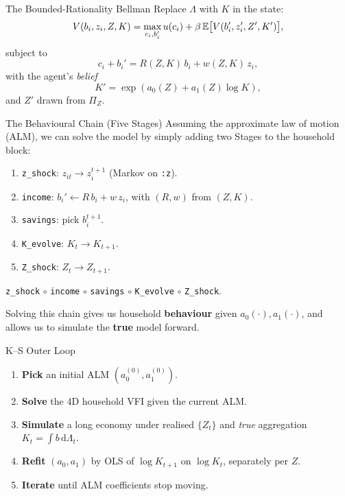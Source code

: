 \documentclass[10pt,aspectratio=169]{beamer}
\begin{document}
\begin{frame}{The Bounded-Rationality Bellman}
  Replace $\Lambda$ with $K$ in the state:
  \[
    V(b_i, z_i, Z, K) = \max_{c_i, b_i'} u(c_i) + \beta\, \mathbb{E}\bigl[V(b_i', z_i', Z', K')\bigr],
  \]
  subject to
  \[
    c_i + b_i' = R(Z, K)\, b_i + w(Z, K)\, z_i,
  \]
  with the agent's \emph{belief}
  \[
    K' = \exp(a_0(Z) + a_1(Z) \log K),
  \]
  and $Z'$ drawn from $\Pi_Z$.
\end{frame}

\begin{frame}{The Behavioural Chain (Five Stages)}
  Assuming the approximate law of motion (ALM), we can solve the model by simply adding two Stages to the household block:
  \begin{enumerate}
    \item \texttt{z\_shock}: $z_{it} \to z_i^{t+1}$ (Markov on \texttt{:z}).
    \item \texttt{income}: $b_i' \gets R\, b_i + w\, z_i$, with $(R, w)$ from $(Z, K)$.
    \item \texttt{savings}: pick $b_i^{t+1}$.
    \item \texttt{K\_evolve}: $K_t \to K_{t+1}$.
    \item \texttt{Z\_shock}: $Z_t \to Z_{t+1}$.
  \end{enumerate}

  \begin{center}\small
  \texttt{z\_shock} $\circ$ \texttt{income} $\circ$ \texttt{savings} $\circ$ \texttt{K\_evolve} $\circ$ \texttt{Z\_shock}.
  \end{center}

  Solving this chain gives us household \textbf{behaviour} given $a_0(\cdot), a_1(\cdot)$, and allows us to simulate the \textbf{true} model forward.
\end{frame}

\begin{frame}{K--S Outer Loop}
  \begin{enumerate}
    \item \textbf{Pick} an initial ALM $(a_0^{(0)}, a_1^{(0)})$.
    \item \textbf{Solve} the 4D household VFI given the current ALM.
    \item \textbf{Simulate} a long economy under realised $\{Z_t\}$ and \emph{true} aggregation $K_t = \int b\, \mathrm d\Lambda_t$.
    \item \textbf{Refit} $(a_0, a_1)$ by OLS of $\log K_{t+1}$ on $\log K_t$, separately per $Z$.
    \item \textbf{Iterate} until ALM coefficients stop moving.
  \end{enumerate}
\end{frame}
\end{document}
